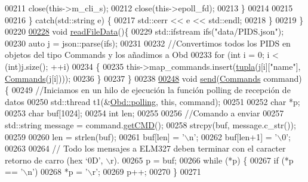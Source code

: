 \begin{DoxyCode}
{{{{{{00211                 close(this->m\_cli\_s);
00212                 close(this->epoll\_fd);
00213             \}
00214 
00215 
00216         \} \textcolor{keywordflow}{catch}(std::string e) \{
00217             std::cerr << e << std::endl;
00218         \}
00219     \}
00220 
\hyperlink{classObd_a2b8bd75834351a2205d53aec8b3747be}{00228}     \textcolor{keywordtype}{void} \hyperlink{classObd_a2b8bd75834351a2205d53aec8b3747be}{readFileData}()\{
00229         std::ifstream ifs(\textcolor{stringliteral}{"data/PIDS.json"});
00230         \textcolor{keyword}{auto} j = json::parse(ifs);
00231 
00232         \textcolor{comment}{//Convertimos todos los PIDS en objetos del tipo Commands y los añadimos a Obd}
00233         \textcolor{keywordflow}{for} (\textcolor{keywordtype}{int} i = 0; i < (int)j.size(); ++i)
00234         \{
00235             this->map\_commands.insert(\hyperlink{Obd_8hpp_aaa63a77fc61ef01154d73b6fac67f1af}{tupla}(j[i][\textcolor{stringliteral}{"name"}], \hyperlink{classCommands}{Commands}(j[i])));
00236         \}
00237     \}
00238     
\hyperlink{classObd_a453591bc9a280e8d44d82025ce8590e9}{00248}     \textcolor{keywordtype}{void} \hyperlink{classObd_a453591bc9a280e8d44d82025ce8590e9}{send}(\hyperlink{classCommands}{Commands} command)\{
00249         \textcolor{comment}{//Iniciamos en un hilo de ejecución la función polling de recepción de datos}
00250         std::thread t1(&\hyperlink{classObd_a0792ecb9247f32760269fdf64a178f8f}{Obd::polling}, \textcolor{keyword}{this}, command);
00251 
00252         \textcolor{keywordtype}{char} *p;
00253         \textcolor{keywordtype}{char} buf[1024];
00254         \textcolor{keywordtype}{int} len;
00255 
00256         \textcolor{comment}{//Comando a enviar}
00257         std::string message = command.\hyperlink{classCommands_a9aee21ab91fdfc8e9daa59e1e8f20b73}{getCMD}();
00258         strcpy(buf, message.c\_str());
00259 
00260         len = strlen(buf);
00261         buf[len] = \textcolor{charliteral}{'\(\backslash\)n'};
00262         buf[len+1] = \textcolor{charliteral}{'\(\backslash\)0'};
00263         
00264         \textcolor{comment}{// Todo los mensajes a ELM327  deben terminar con el caracter retorno de carro (hex  ‘0D’, \(\backslash\)r).}
00265         p = buf;
00266         \textcolor{keywordflow}{while} (*p) \{
00267             \textcolor{keywordflow}{if} (*p == \textcolor{charliteral}{'\(\backslash\)n'})
00268                 *p = \textcolor{charliteral}{'\(\backslash\)r'};
00269             p++;
00270         \}
00271         
}}}}}}
\end{DoxyCode}
